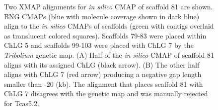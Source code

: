 \documentclass{bmcart}
\begin{document}
\begin{backmatter}
\begin{figure}[h!]
	\caption{
		Two XMAP alignments for \textit{in silico} CMAP of scaffold 81 are shown. BNG CMAPs (blue with molecule coverage shown in dark blue) align to the \textit{in silico} CMAPs of scaffolds (green with contigs overlaid as translucent colored squares). Scaffolds 79-83 were placed within ChLG 5 and scaffolds 99-103 were placed with ChLG 7 by the \textit{Tribolium} genetic map. (A) Half of the \textit{in silico} CMAP of scaffold 81 aligns with its assigned ChLG (black arrow). (B) The other half aligns with ChLG 7 (red arrow) producing a negative gap length smaller than -20 (kb). The alignment that places scaffold 81 with ChLG 7 disagrees with the genetic map and was manually rejected for Tcas5.2.}
      \end{figure}            





\end{backmatter}
\end{document}
